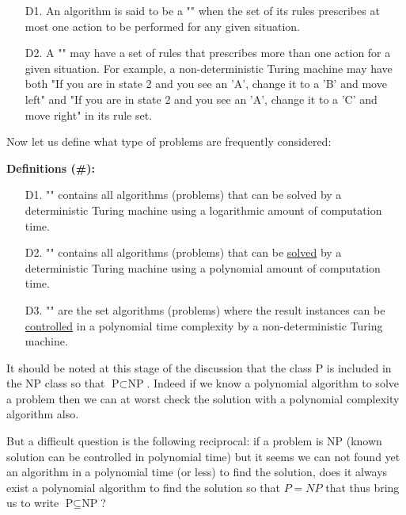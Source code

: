 \begin{enumerate}
	\item[D1.] An algorithm is said to be a "" when the set of its rules prescribes at most one action to be performed for any given situation.
	
	\item[D2.] A "" may have a set of rules that prescribes more than one action for a given situation. For example, a non-deterministic Turing machine may have both "If you are in state 2 and you see an 'A', change it to a 'B' and move left" and "If you are in state 2 and you see an 'A', change it to a 'C' and move right" in its rule set.
\end{enumerate}

Now let us define what type of problems are frequently considered:

\textbf{Definitions (\#\mydef):}

\begin{enumerate}
	\item[D1.] "" contains all algorithms (problems) that can be solved by a deterministic Turing machine using a logarithmic amount of computation time.
	
	\item[D2.] "" contains all algorithms (problems) that can be \underline{solved} by a deterministic Turing machine using a polynomial amount of computation time.
	
	\item[D3.] "" are the set algorithms (problems) where the result instances can be \underline{controlled} in a polynomial time complexity by a non-deterministic Turing machine. 
\end{enumerate}

It should be noted at this stage of the discussion that the class P is included in the NP class so that $\text{P} \subset \text{NP} $. Indeed if we know a polynomial algorithm to solve a problem then we can at worst check the solution with a polynomial complexity algorithm also.

	But a difficult question is the following reciprocal: if a problem is NP (known solution can be controlled in polynomial time) but it seems we can not found yet an algorithm in a polynomial time (or less) to find the solution, does it always exist a polynomial algorithm to find the solution so that $P=NP$ that thus bring us to write  $\text{P} \subseteq \text{NP}$?
	
